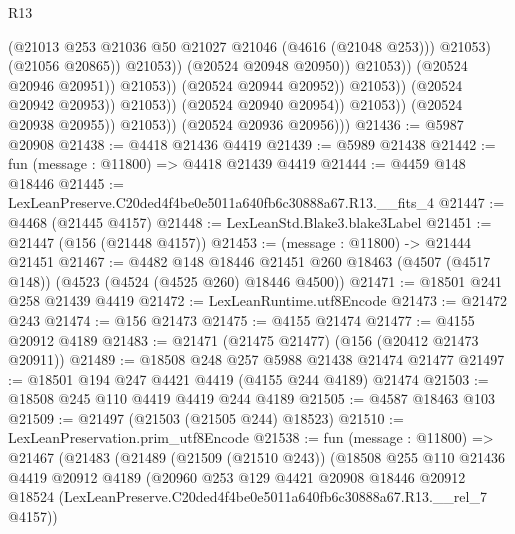 \begin{lexlean}{R13}
\begin{coremodule}
                                                    (@21013
                                                      @253
                                                      @21036
                                                      @50
                                                      @21027
                                                      @21046
                                                      (@4616 (@21048 @253)))
                                                    @21053)
                                                  (@21056 @20865))
                                                @21053))
                                            (@20524 @20948 @20950))
                                          @21053))
                                      (@20524 @20946 @20951))
                                    @21053))
                                (@20524 @20944 @20952))
                              @21053))
                          (@20524 @20942 @20953))
                        @21053))
                    (@20524 @20940 @20954))
                  @21053))
              (@20524 @20938 @20955))
            @21053))
        (@20524 @20936 @20956)))
@21436 := @5987 @20908
@21438 := @4418 @21436 @4419
@21439 := @5989 @21438
@21442 := fun (message : @11800) => @4418 @21439 @4419
@21444 := @4459 @148 @18446
@21445 := LexLeanPreserve.C20ded4f4be0e5011a640fb6c30888a67.R13.__fits_4
@21447 := @4468 (@21445 @4157)
@21448 := LexLeanStd.Blake3.blake3Label
@21451 := @21447 (@156 (@21448 @4157))
@21453 := (message : @11800) -> @21444 @21451
@21467 := @4482
    @148
    @18446
    @21451
    @260
    @18463
    (@4507 (@4517 @148))
    (@4523 (@4524 (@4525 @260) @18446 @4500))
@21471 := @18501 @241 @258 @21439 @4419
@21472 := LexLeanRuntime.utf8Encode
@21473 := @21472 @243
@21474 := @156 @21473
@21475 := @4155 @21474
@21477 := @4155 @20912 @4189
@21483 := @21471 (@21475 @21477) (@156 (@20412 @21473 @20911))
@21489 := @18508 @248 @257 @5988 @21438 @21474 @21477
@21497 := @18501 @194 @247 @4421 @4419 (@4155 @244 @4189) @21474
@21503 := @18508 @245 @110 @4419 @4419 @244 @4189
@21505 := @4587 @18463 @103
@21509 := @21497 (@21503 (@21505 @244) @18523)
@21510 := LexLeanPreservation.prim_utf8Encode
@21538 := fun (message : @11800) =>
  @21467
    (@21483
      (@21489
        (@21509 (@21510 @243))
        (@18508
          @255
          @110
          @21436
          @4419
          @20912
          @4189
          (@20960
            @253
            @129
            @4421
            @20908
            @18446
            @20912
            @18524
            (LexLeanPreserve.C20ded4f4be0e5011a640fb6c30888a67.R13.__rel_7 @4157))

\end{coremodule}
\end{lexlean}
